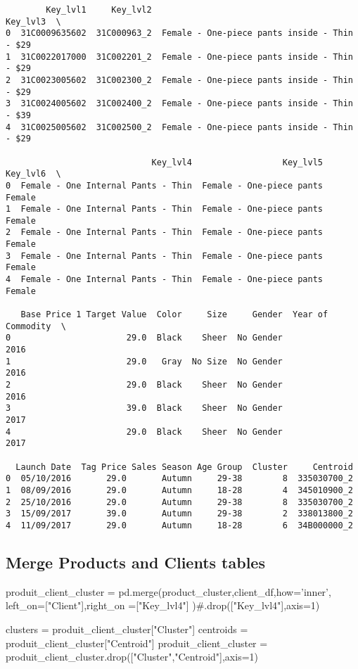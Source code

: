 \documentclass[11pt]{article}
\begin{document}
    
    \begin{verbatim}
        Key_lvl1     Key_lvl2                                      Key_lvl3  \
0  31C0009635602  31C000963_2  Female - One-piece pants inside - Thin - $29   
1  31C0022017000  31C002201_2  Female - One-piece pants inside - Thin - $29   
2  31C0023005602  31C002300_2  Female - One-piece pants inside - Thin - $29   
3  31C0024005602  31C002400_2  Female - One-piece pants inside - Thin - $39   
4  31C0025005602  31C002500_2  Female - One-piece pants inside - Thin - $29   

                             Key_lvl4                  Key_lvl5 Key_lvl6  \
0  Female - One Internal Pants - Thin  Female - One-piece pants   Female   
1  Female - One Internal Pants - Thin  Female - One-piece pants   Female   
2  Female - One Internal Pants - Thin  Female - One-piece pants   Female   
3  Female - One Internal Pants - Thin  Female - One-piece pants   Female   
4  Female - One Internal Pants - Thin  Female - One-piece pants   Female   

   Base Price 1 Target Value  Color     Size     Gender  Year of Commodity  \
0                       29.0  Black    Sheer  No Gender               2016   
1                       29.0   Gray  No Size  No Gender               2016   
2                       29.0  Black    Sheer  No Gender               2016   
3                       39.0  Black    Sheer  No Gender               2017   
4                       29.0  Black    Sheer  No Gender               2017   

  Launch Date  Tag Price Sales Season Age Group  Cluster     Centroid  
0  05/10/2016       29.0       Autumn     29-38        8  335030700_2  
1  08/09/2016       29.0       Autumn     18-28        4  345010900_2  
2  25/10/2016       29.0       Autumn     29-38        8  335030700_2  
3  15/09/2017       39.0       Autumn     29-38        2  338013800_2  
4  11/09/2017       29.0       Autumn     18-28        6  34B000000_2  
    \end{verbatim}

    
    \subsection{Merge Products and Clients
tables}\label{merge-products-and-clients-tables}
produit_client_cluster = pd.merge(product_cluster,client_df,how='inner', left_on=["Client"],right_on =["Key_lvl4"] )#.drop(["Key_lvl4"],axis=1)

clusters = produit_client_cluster["Cluster"]
centroids = produit_client_cluster["Centroid"]
produit_client_cluster = produit_client_cluster.drop(["Cluster","Centroid"],axis=1)
\end{document}
